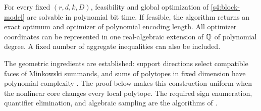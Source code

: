 \begin{theorem}
\label{s4:fixed-core}
For every fixed $(r,d,k,D)$, feasibility and global optimization of
\eqref{s4:block-model} are solvable in polynomial bit time. If feasible,
the algorithm returns an exact optimum and optimizer of polynomial
encoding length. All optimizer coordinates can be represented in one
real-algebraic extension of $\mathbb Q$ of polynomial degree. A fixed number
of aggregate inequalities can also be included.
\end{theorem}

The geometric ingredients are established: support directions select
compatible faces of Minkowski summands, and sums of polytopes in fixed
dimension have polynomial complexity
\citep{s4:gritzmann1993,s4:fukuda2004}. The proof below makes this
construction uniform when the nonlinear core changes every local
polytope. The required sign enumeration, quantifier elimination, and
algebraic sampling are the algorithms of
\citet[Theorem~1.3.1 and Sections~3.1.3--3.2]
{basu1996-on-the-combinatorial-and-algebraic}.

